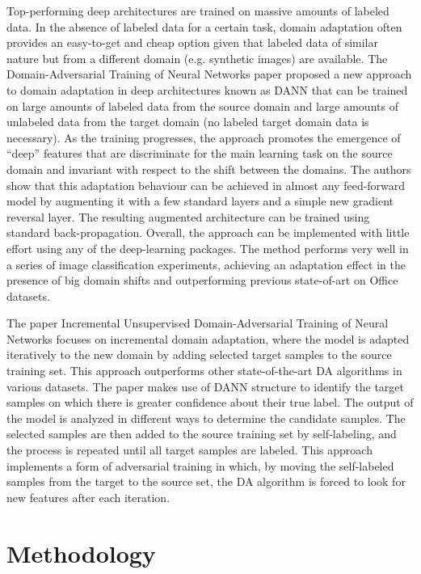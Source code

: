 \documentclass[sigconf,authordraft]{acmart}
\begin{document}
\noindent Top-performing deep architectures are trained on massive amounts of labeled data. In the absence of labeled data for a certain task, domain adaptation often provides an easy-to-get and cheap option given that labeled data of similar nature but from a different domain (e.g. synthetic images) are available. The Domain-Adversarial Training of Neural Networks paper proposed a new approach to domain adaptation in deep architectures known as DANN that can be trained on large amounts of labeled data from the source domain and large amounts of unlabeled data from the target domain (no labeled target domain data is necessary). As the training progresses, the approach promotes the emergence of “deep” features that are discriminate for the main learning task on the source domain and invariant with respect to the shift between the domains. The authors show that this adaptation behaviour can be achieved in almost any feed-forward model by augmenting it with a few standard layers and a simple new gradient reversal layer. The resulting augmented architecture can be trained using standard back-propagation. Overall, the approach can be implemented with little effort using any of the deep-learning packages. The method performs very well in a series of image classification experiments, achieving an adaptation effect in the presence of big domain shifts and outperforming previous state-of-art on Office datasets. 

\noindent The paper Incremental Unsupervised Domain-Adversarial Training of Neural Networks\cite{19}  focuses on incremental domain adaptation, where the model is adapted iteratively to the new domain by adding selected target samples to the source training set. This approach outperforms other state-of-the-art DA algorithms in various datasets. The paper makes use of DANN structure to identify the target samples on which there is greater confidence about their true label. The output of the model is analyzed in different ways to determine the candidate samples. The selected samples are then added to the source training set by self-labeling, and the process is repeated until all target samples are labeled. This approach implements a form of adversarial training in which, by moving the self-labeled samples from the target to the source set, the DA algorithm is forced to look for new features after each iteration.
\noindent

\section{Methodology}
\end{document}
